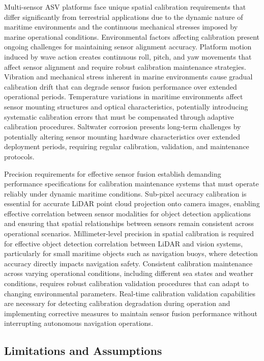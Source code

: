 \documentclass{erauthesis}
\begin{document}
Multi-sensor \ac{ASV} platforms face unique spatial calibration requirements that differ significantly from terrestrial applications due to the dynamic nature of maritime environments and the continuous mechanical stresses imposed by marine operational conditions.
Environmental factors affecting calibration present ongoing challenges for maintaining sensor alignment accuracy. Platform motion induced by wave action creates continuous roll, pitch, and yaw movements that affect sensor alignment and require robust calibration maintenance strategies. Vibration and mechanical stress inherent in marine environments cause gradual calibration drift that can degrade sensor fusion performance over extended operational periods. Temperature variations in maritime environments affect sensor mounting structures and optical characteristics, potentially introducing systematic calibration errors that must be compensated through adaptive calibration procedures. Saltwater corrosion presents long-term challenges by potentially altering sensor mounting hardware characteristics over extended deployment periods, requiring regular calibration, validation, and maintenance protocols.

Precision requirements for effective sensor fusion establish demanding performance specifications for calibration maintenance systems that must operate reliably under dynamic maritime conditions. Sub-pixel accuracy calibration is essential for accurate \ac{LiDAR} point cloud projection onto camera images, enabling effective correlation between sensor modalities for object detection applications and ensuring that spatial relationships between sensors remain consistent across operational scenarios. Millimeter-level precision in spatial calibration is required for effective object detection correlation between \ac{LiDAR} and vision systems, particularly for small maritime objects such as navigation buoys, where detection accuracy directly impacts navigation safety. Consistent calibration maintenance across varying operational conditions, including different sea states and weather conditions, requires robust calibration validation procedures that can adapt to changing environmental parameters. Real-time calibration validation capabilities are necessary for detecting calibration degradation during operation and implementing corrective measures to maintain sensor fusion performance without interrupting autonomous navigation operations.

\subsection{Limitations and Assumptions} \label{limitations}
\end{document}
